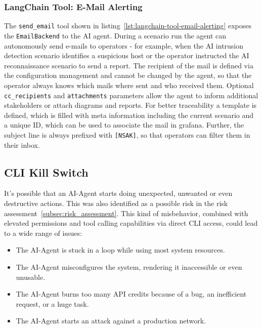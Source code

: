 \subsubsection{LangChain Tool: E-Mail Alerting}\label{subsubsec:langchain-tool-e-mail-alerting}

The \texttt{send_email} tool shown in listing~\ref{lst:langchain-tool-email-alerting} exposes the \texttt{EmailBackend} to the \gls{AI} agent.
During a scenario run the agent can autonomously send e-mails to operators - for example,
when the \gls{AI} intrusion detection scenario identifies a suspicious host or the operator instructed the \gls{AI} reconnaissance scenario to send a report.
The recipient of the mail is defined via the configuration management and cannot be changed by the agent, so that the operator always knows which mails where sent and who received them.
Optional \texttt{cc_recipients} and \texttt{attachments} parameters allow the agent to inform additional stakeholders or attach diagrams and reports.
For better \gls{traceability} a template is defined, which is filled with meta information including the current scenario and a unique ID,
which can be used to associate the mail in grafana.
Further, the subject line is always prefixed with \texttt{[NSAK]}, so that operators can filter them in their inbox.


\subsection{CLI Kill Switch}\label{subsec:ai-scenarios-implementation-cli-kill-switch}
It's possible that an \gls{AI}-Agent starts doing unexpected, unwanted or even destructive actions.
This was also identified as a possible risk in the risk assessment~\ref{subsec:risk_assessment}.
This kind of misbehavior, combined with elevated permissions and tool calling capabilities via direct \gls{CLI} access,
could lead to a wide range of issues:

\begin{itemize}
    \item The \gls{AI}-Agent is stuck in a loop while using most system resources.
    \item The \gls{AI}-Agent misconfigures the system, rendering it inaccessible or even unusable.
    \item The \gls{AI}-Agent burns too many \gls{API} credits because of a bug, an inefficient request, or a huge task.
    \item The \gls{AI}-Agent starts an attack against a production network.
\end{itemize}

